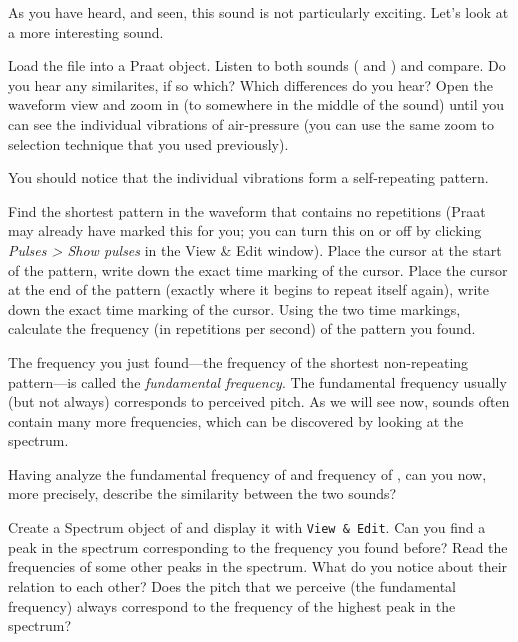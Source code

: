 \documentclass[a4paper, 9pt]{article}
\begin{document}
As you have heard, and seen, this sound is not particularly exciting.
Let's look at a more interesting sound.

\begin{exercise}
\action Load the file  into a Praat object.
\action Listen to both sounds ( and ) and compare. Do you hear any similarites, if so which? Which differences do you hear?
\action Open the waveform view and zoom in (to somewhere in the middle of the sound) until you can see the individual vibrations of air-pressure (you can use the same zoom to selection technique that you used previously).
\end{exercise}

\newpage
\noindent You should notice that the individual vibrations form a self-repeating
pattern.

\begin{exercise}
\action Find the shortest pattern in the waveform that contains no repetitions (Praat may already have marked this for you; you can turn this on or off by clicking \emph{Pulses > Show pulses} in the View \& Edit window).
\action Place the cursor at the start of the pattern, write down the exact time marking of the cursor. 
\action Place the cursor at the end of the pattern (exactly where it begins to repeat itself again), write down the exact time marking of the cursor. 
\askstar Using the two time markings, calculate the frequency (in repetitions per second) of the pattern you found. 
\end{exercise}

The frequency you just found---the frequency of the shortest
non-repeating pattern---is called the \emph{fundamental frequency}. The
fundamental frequency usually (but not always) corresponds to perceived
pitch. As we will see now, sounds often contain many more frequencies,
which can be discovered by looking at the spectrum.

\begin{exercise}
\askstar Having analyze the fundamental frequency of  and frequency of , can you now, more precisely, describe the similarity between the two sounds?
\end{exercise}

\begin{exercise}
\action Create a Spectrum object of  and display it with \texttt{View \& Edit}. 
\action Can you find a peak in the spectrum corresponding to the frequency you found before?  
\action Read the frequencies of some other peaks in the spectrum. What do you notice about their relation to each other?
\askstar Does the pitch that we perceive (the fundamental frequency) always correspond to the frequency of the highest peak in the spectrum? 
\end{exercise}
\end{document}
